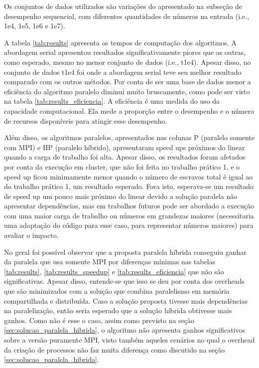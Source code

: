 \documentclass[12pt]{article}
\begin{document}
Os conjuntos de dados utilizados são variações do apresentado na subseção de desempenho sequencial, com diferentes quantidades de números na entrada (i.e., 1e4, 1e5, 1e6 e 1e7).

A tabela \ref{tab:results} apresenta os tempos de computação dos algoritmos. A abordagem serial apresentou resultados significativamente piores que as outras, como esperado, mesmo no menor conjunto de dados (i.e., t1e4). Apesar disso, no conjunto de dados t1e4 foi onde a abordagem serial teve seu melhor resultado comparado com os outros métodos. Por conta de ser uma base de dados menor a eficiência do algoritmo paralelo diminui muito bruscamente, como pode ser visto na tabela \ref{tab:results_eficiencia}. A eficiência é uma medida do uso da capacidade computacional. Ela mede a proporção entre o desempenho e o número de recursos disponíveis para atingir esse desempenho.

Além disso, os algoritmos paralelos, apresentados nas colunas P (paralelo somente com MPI) e HP (paralelo híbrido), apresentaram speed ups próximos do linear quando a carga de trabalho foi alta. Apesar disso, os resultados foram afetados por conta da execução em cluster, que não foi feita no trabalho prático 1, e o speed up ficou minimamente menor quando o número de escravos total é igual ao do trabalho prático 1, um resultado esperado. Fora isto, esperava-se um resultado de speed up um pouco mais próximo do linear devido a solução paralela não apresentar dependências, mas em trabalhos futuros pode ser abordado a execução com uma maior carga de trabalho ou números em grandezas maiores (necessitaria uma adaptação do código para esse caso, para representar números maiores) para avaliar o impacto.

No geral foi possível observar que a proposta paralela híbrida conseguiu ganhar da paralela que usa somente MPI por diferenças mínimas nas tabelas \ref{tab:results}, \ref{tab:results_speedup} e \ref{tab:results_eficiencia} que não são significativas. Apesar disso, entende-se que isso se deu por conta dos overheads que são minimizados com a solução que combina paralelismo em memória compartilhada e distribuída. Caso a solução proposta tivesse mais dependências na paralelização, então seria esperado que a solução híbrida obtivesse mais ganhos. Como não é esse o caso, assim como previsto na seção \ref{sec:solucao_paralela_hibrida}, o algoritmo não apresenta ganhos significativos sobre a versão puramente MPI, visto também aqueles cenários no qual o overhead da criação de processos não faz muita diferença como discutido na seção \ref{sec:solucao_paralela_hibrida}.
\end{document}
